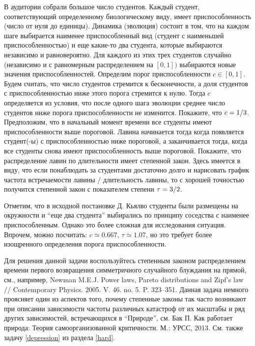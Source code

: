 \begin{problem}  
В аудитории собрали большое число студентов. Каждый студент, соответствующий 
определенному биологическому виду, имеет приспособленность (число от нуля до 
единицы). Динамика (эволюция) состоит в том, что на каждом шаге выбирается 
наименее приспособленный вид (студент с наименьшей приспособленностью) и еще 
какие-то два студента, которые выбираются независимо и 
равновероятно. Для каждого из этих трех студентов случайно (независимо 
и с равномерным распределением на $\left[ {0,1} \right])$ выбираются новые 
значения приспособленностей. Определим порог приспособленности $c\in \left[ 
{0,1} \right]$. Будем считать, что число студентов стремится к 
бесконечности, а доля студентов с приспособленностью ниже этого порога 
стремится к нулю. Тогда $c$ определяется из условия, что после одного шага 
эволюции среднее число студентов ниже порога приспособленности не изменится. 
Покажите, что ${c=1} \mathord{\left/ {\vphantom {{c=1} 3}} \right. 
\kern-\nulldelimiterspace} 3$. Предположим, что в начальный момент времени 
все студенты имеют приспособленности выше пороговой. Лавина начинается тогда 
когда появляется студент(-ы) с приспособленностью ниже пороговой, а 
заканчивается тогда, когда все студенты снова имеют приспособленность выше 
пороговой. Покажите, что распределение лавин по длительности имеет степенной 
закон. Здесь имеется в виду, что если понаблюдать за студентами достаточно 
долго и нарисовать график частота встречаемости лавины / длительность 
лавины, то с хорошей точностью получится степенной закон с показателем 
степени ${\tau =3} \mathord{\left/ {\vphantom {{\tau =3} 2}} \right. 
\kern-\nulldelimiterspace} 2$.

\end{problem}

\begin{ordre}
Отметим, что в исходной постановке Д. Кьялво студенты были 
размещены на окружности и ``еще два студента'' выбирались по принципу 
соседства с наименее приспособленным. Однако это более сложная для 
исследования ситуация. Впрочем, можно посчитать: $c\simeq 0.667$, $\tau 
\simeq 1.07$, но это требует более изощренного определения порога 
приспособленности.

Для решения данной задачи воспользуйтесь степенным законом распределением времени 
первого возвращения симметричного случайного блуждания на прямой, см., 
например, Newman M.E.J. Power laws, Pareto distributions and Zipf's law // Contemporary 
Physics. 2005. V. 46. no. 5. P. 323--351. Данная задача немного проясняет один 
из аспектов того, почему степенные законы так часто возникают при описании 
зависимости частоты различных катастроф от их масштабы и ряд других 
зависимостей, встречающихся в ``Природе'', см. Бак П. Как работает природа: Теория 
самоорганизованной критичности. М.: УРСС, 2013. См. также задачу \ref{depression} из раздела
\ref{hard}.

\end{ordre}

